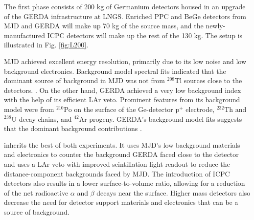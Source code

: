 The first phase  consists of 200 kg of Germanium detectors housed in an upgrade of the GERDA infrastructure at LNGS. Enriched PPC and BeGe detectors from MJD and GERDA will make up 70 kg of the source mass, and the newly-manufactured ICPC detectors will make up the rest of the 130 kg. The setup is illustrated in Fig. \ref{fig:L200}. 

MJD achieved excellent energy resolution, primarily due to its low noise and low background electronics. Background model spectral fits indicated that the dominant source of background in MJD was not from $^{208}$Tl sources close to the detectors. \cite{Buuck_thesis}. On the other hand, GERDA achieved a very low background index with the help of its efficient LAr veto. Prominent features from its background model were from $^{210}$Po on the surface of the Ge-detector p$^+$ electrode, $^{232}$Th and $^{238}$U decay chains, and $^{42}$Ar progeny. GERDA's background model fits suggests that the dominant background contributions \cite{GERDA_final}.

{\Ltwo} inherits the best of both experiments. It uses MJD's low background materials and electronics to counter the background GERDA faced close to the detector and uses a LAr veto with improved scintillation light readout to reduce the distance-component backgrounds faced by MJD. The introduction of ICPC detectors also results in a lower surface-to-volume ratio, allowing for a reduction of the net radioactive $\alpha$ and $\beta$ decays near the surface. Higher mass detectors also decrease the need for detector support materials and electronics that can be a source of background. 

